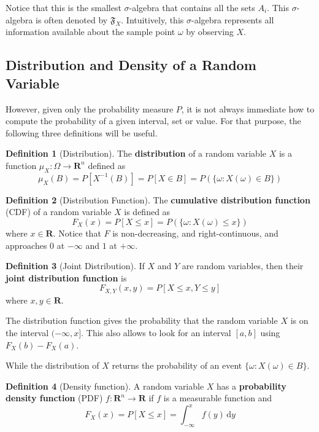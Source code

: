 \documentclass[12pt,a4paper]{article}
\theoremstyle{definition}
\newtheorem{definition}{Definition}[section]
\begin{document}
Notice that this is the smallest $\sigma$-algebra that contains all the sets $A_i$. This $\sigma$-algebra is often denoted by $\mathfrak{F}_X$. Intuitively, this $\sigma$-algebra represents all information available about the sample point $\omega$ by observing $X$. 


\subsection{Distribution and Density of a Random Variable}

However, given only the probability measure $P$, it is not always immediate how to compute the probability of a given interval, set or value. For that purpose, the following three definitions will be useful.

\begin{definition}[Distribution]
	The \textbf{distribution} of a random variable $X$ is a function $\mu_X : \Omega \longrightarrow \textbf{R}^n$ defined as
	\[
		\mu_X(B) = P [X^{-1}(B)] = P[X \in B] = P(\{ \omega : X(\omega) \in B \})
	\]
\end{definition}

\begin{definition}[Distribution Function]
	The \textbf{cumulative distribution function} (CDF) of a random variable $X$ is defined as
	\[
		F_X(x) = P [X \leq x] = P(\{ \omega : X(\omega) \leq x \})
	\]
	where $x \in \textbf{R}$. Notice that $F$ is non-decreasing, and right-continuous, and approaches $0$ at $- \infty$ and $1$ at $+\infty$.
\end{definition}

\begin{definition}[Joint Distribution]
	If $X$ and $Y$ are random variables, then their \textbf{joint distribution function} is
	\[
		F_{X,Y}(x,y) = P [X \leq x, Y \leq y]
	\]
	where $x,y \in \textbf{R}$.
\end{definition}

The distribution function gives the probability that the random variable $X$ is on the interval $(-\infty, x]$. This also allows to look for an interval $[a,b]$ using $F_X(b) - F_X(a)$.

While the distribution of $X$ returns the probability of an event $\{ \omega : X(\omega) \in B\}$.

\begin{definition}[Density function]
	A random variable $X$ has a \textbf{probability density function} (PDF) $f : \textbf{R}^n \longrightarrow \textbf{R}$ if $f$ is a measurable function and \[ F_X(x) = P[X \leq x] = \int_{-\infty}^x f(y) \, \mathrm{d}y \]
\end{definition}
\end{document}
